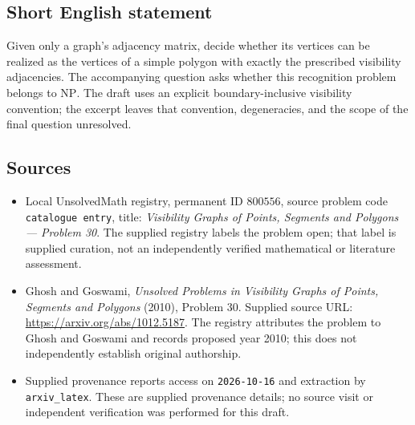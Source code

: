 \documentclass[11pt]{article}
\begin{document}
\subsection{Short English statement}
Given only a graph's adjacency matrix, decide whether its vertices can be realized as the vertices of a simple polygon with exactly the prescribed visibility adjacencies. The accompanying question asks whether this recognition problem belongs to \(\mathrm{NP}\). The draft uses an explicit boundary-inclusive visibility convention; the excerpt leaves that convention, degeneracies, and the scope of the final question unresolved.
\subsection{Sources}
\begin{itemize}
\item Local UnsolvedMath registry, permanent ID \(800556\), source problem code \texttt{catalogue entry}, title: \emph{Visibility Graphs of Points, Segments and Polygons --- Problem 30}. The supplied registry labels the problem open; that label is supplied curation, not an independently verified mathematical or literature assessment.
\item Ghosh and Goswami, \emph{Unsolved Problems in Visibility Graphs of Points, Segments and Polygons} (2010), Problem 30. Supplied source URL: \url{https://arxiv.org/abs/1012.5187}. The registry attributes the problem to Ghosh and Goswami and records proposed year 2010; this does not independently establish original authorship.
\item Supplied provenance reports access on \texttt{2026-10-16} and extraction by \texttt{arxiv\_latex}. These are supplied provenance details; no source visit or independent verification was performed for this draft.
\end{itemize}
\end{document}

